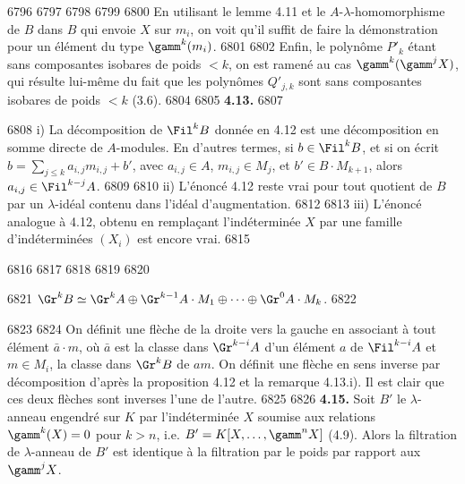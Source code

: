   6796	
  6797	%
  6798	%
  6799	%
  6800	En utilisant le lemme 4.11 et le $A$-$\lambda$-homomorphisme de $B$ dans $B$ qui envoie $X$ sur $m_i$, on voit qu'il suffit de faire la d\'emonstration pour un \'el\'ement du type $\gamm^k(m_i)$.
  6801	
  6802		Enfin, le polyn\^ome $P'_k$ \'etant sans composantes isobares de poids $< k$, on est ramen\'e au cas $\gamm^k(\gamm^j X)$, qui r\'esulte lui-m\^eme du fait que les polyn\^omes $Q'_{j,k}$ sont sans composantes isobares de poids $< k$ (3.6).
  6804	
  6805		\noindent\textbf{4.13.}
  6807	\begin{remarques}
  6808	i) La d\'ecomposition de $\Fil^k B$ donn\'ee en 4.12 est une d\'ecomposition en somme directe de $A$-modules. En d'autres termes, si $b \in \Fil^k B$, et si on \'ecrit $b = \sum_{j \leq k} a_{i,j} m_{i,j} + b'$, avec $a_{i,j} \in A$, $m_{i,j} \in M_j$, et $b' \in B \cdot M_{k+1}$, alors $a_{i,j} \in \Fil^{k-j} A$.
  6809	
  6810		ii) L'\'enonc\'e 4.12 reste vrai pour tout quotient de $B$ par un $\lambda$-id\'eal contenu dans l'id\'eal d'augmentation.
  6812	
  6813		iii) L'\'enonc\'e analogue \`a 4.12, obtenu en rempla\c cant l'ind\'etermin\'ee $X$ par une famille d'ind\'etermin\'ees $(X_i)$ est encore vrai.
  6815	\end{remarques}
  6816	
  6817	%
  6818	%
  6819	%
  6820	\begin{corollaire}
  6821	$\Gr^k B \simeq \Gr^k A \oplus \Gr^{k-1} A \cdot M_1 \oplus \cdots \oplus \Gr^0 A \cdot M_k$.
  6822	\end{corollaire}
  6823	
  6824	On d\'efinit une fl\`eche de la droite vers la gauche en associant \`a tout \'el\'ement $\bar{a} \cdot m$, o\`u $\bar{a}$ est la classe dans $\Gr^{k-i} A$ d'un \'el\'ement $a$ de $\Fil^{k-i} A$ et $m \in M_i$, la classe dans $\Gr^k B$ de $am$. On d\'efinit une fl\`eche en sens inverse par d\'ecomposition d'apr\`es la proposition 4.12 et la remarque 4.13.i). Il est clair que ces deux fl\`eches sont inverses l'une de l'autre.
  6825	
  6826		\noindent\textbf{4.15.} Soit $B'$ le $\lambda$-anneau engendr\'e sur $K$ par l'ind\'etermin\'ee $X$ soumise aux relations $\gamm^k(X) = 0$ pour $k > n$, i.e. $B' = K[X, \ldots, \gamm^n X]$ (4.9). Alors la filtration de $\lambda$-anneau de $B'$ est identique \`a la filtration par le poids par rapport aux $\gamm^j X$.

